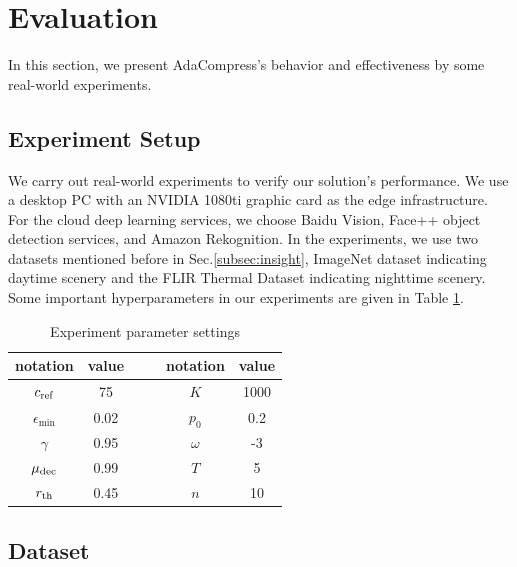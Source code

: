 \section{Evaluation}
\label{sec: evaluation}

In this section, we present AdaCompress's behavior and effectiveness by some real-world experiments. %

\subsection{Experiment Setup}

We carry out real-world experiments to verify our solution's performance. We use a desktop PC with an NVIDIA 1080ti graphic card as the edge infrastructure. For the cloud deep learning services, we choose Baidu Vision, Face++ object detection services, and Amazon Rekognition. In the experiments, we use two datasets mentioned before in Sec.\ref{subsec:insight}, ImageNet dataset indicating daytime scenery and the FLIR Thermal Dataset indicating nighttime scenery. Some important hyperparameters in our experiments are given in Table \ref{tab: parameters}.


\begin{table}[H]
    \centering
    \begin{tabular}{cccccc}
        \toprule
        notation          & value & & & notation     & value  \\ \midrule
        $c_{\rm ref}$ & 75    & & & $K$      & 1000   \\
        $\epsilon_{\min}$    & 0.02  & & & $p_0$    & 0.2    \\
        $\gamma$      & 0.95  & & & $\omega$ & -3   \\
        $ \mu_{\rm dec} $ & 0.99 & & & $ T $ & 5  \\
        $r_{\rm th}$  & 0.45   & & &   $ n  $  &  10      \\ \bottomrule
    \end{tabular}
    \caption{Experiment parameter settings}
    \label{tab: parameters}
\end{table}

\subsection{Dataset}

